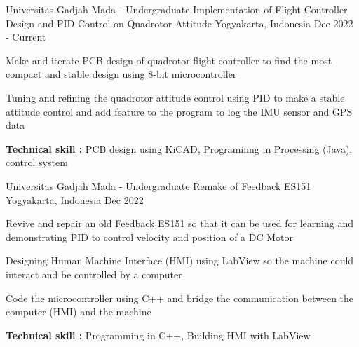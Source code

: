 

\begin{cventries}

  \cventry
    {Universitas Gadjah Mada - Undergraduate} %
    {Implementation of Flight Controller Design and PID Control on Quadrotor Attitude} %
    {Yogyakarta, Indonesia} %
    {Dec 2022 - Current} %
    {
      \begin{cvitems} %
        \item {Make and iterate PCB design of quadrotor flight controller to find the most compact and stable design using 8-bit microcontroller}
        \item {Tuning and refining the quadrotor attitude control using PID to make a stable attitude control and add feature to the program to log the IMU sensor and GPS data}
        \item {\textbf{Technical skill : } PCB design using KiCAD, Programinng in Processing (Java),  control system}
      \end{cvitems}
    }
    
  \cventry
    {Universitas Gadjah Mada - Undergraduate} %
    {Remake of Feedback ES151} %
    {Yogyakarta, Indonesia} %
    {Dec 2022} %
    {
      \begin{cvitems} %
        \item{Revive and repair an old Feedback ES151 so that it can be used for learning and demonstrating PID to control velocity and position of a DC Motor}
        \item{Designing Human Machine Interface (HMI) using LabView so the machine could interact and be controlled by a computer}
        \item{Code the microcontroller using C++ and bridge the communication between the computer (HMI) and the machine}
        \item{\textbf{Technical skill : } Programming in C++, Building HMI with LabView}
      \end{cvitems}
    }
    

\end{cventries}
